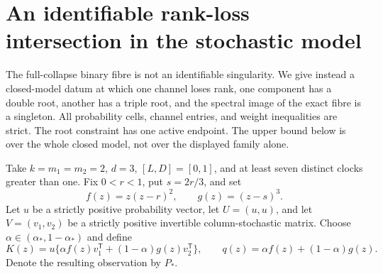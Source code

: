 \section{An identifiable rank-loss intersection in the stochastic model}
\label{sec:stochastic-intersection-v94}
The full-collapse binary fibre is not an identifiable singularity.
We give instead a closed-model datum at which one channel loses rank,
one component has a double root, another has a triple root, and the
spectral image of the exact fibre is a singleton. All probability
cells, channel entries, and weight inequalities are strict. The root
constraint has one active endpoint. The upper bound below is over the
whole closed model, not over the displayed family alone.

Take $k=m_1=m_2=2$, $d=3$, $[L,D]=[0,1]$, and at least seven
distinct clocks greater than one. Fix $0<r<1$, put $s=2r/3$, and set
\begin{equation}\label{eq:cubic-pair-v94}
 f(z)=z(z-r)^2,\qquad g(z)=(z-s)^3.
\end{equation}
Let $u$ be a strictly positive probability vector, let
$U=(u,u)$, and let $V=(v_1,v_2)$ be a strictly positive invertible
column-stochastic matrix. Choose
$\alpha\in(\alpha_*,1-\alpha_*)$ and define
\[
 K(z)=u\{\alpha f(z)v_1^{\mathsf T}
                    +(1-\alpha)g(z)v_2^{\mathsf T}\},
 \qquad q(z)=\alpha f(z)+(1-\alpha)g(z).
\]
Denote the resulting observation by $P_*$.

